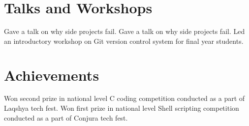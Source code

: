 \documentclass[11pt,a4paper]{moderncv}
\begin{document}
\break


\section{Talks and Workshops}
{Gave a talk on why side projects fail.}
{Gave a talk on why side projects fail.}
{Led an introductory workshop on Git version control system for final year students.}



\section{Achievements}
{Won second prize in national level C coding competition conducted as a part of Laqshya tech fest.}
{Won first prize in national level Shell scripting competition conducted as a part of Conjura tech fest.}

\end{document}
